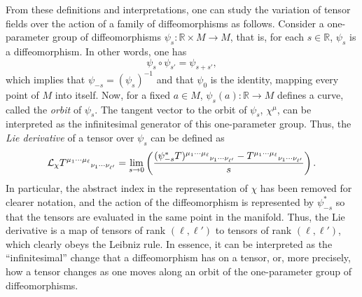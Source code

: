 \documentclass[
12pt,		%
openright,	%
twoside,  %
a4paper,			%
chapter=TITLE,		%
english,			%
french,				%
spanish,			%
brazil				%
]{USPSC-classe/USPSC}
\begin{document}
\begin{apendicesenv}
From these definitions and interpretations, one can study the variation of tensor fields over the action of a family of diffeomorphisms as follows. Consider a one-parameter group of diffeomorphisms $\psi_s:\mathbb{R}\times M\to M$, that is, for each $s\in\mathbb{R}$, $\psi_s$ is a diffeomorphism. In other words, one has 
\begin{equation}
    \psi_{s}\circ\psi_{s'}=\psi_{s+s'},
\end{equation}
which implies that $\psi_{-s}=(\psi_{s})^{-1}$ and that $\psi_0$ is the identity, mapping every point of $M$ into itself. Now, for a fixed $a\in M$, $\psi_s(a):\mathbb{R}\to M$ defines a curve, called the \textit{orbit} of $\psi_s$. The tangent vector to the orbit of $\psi_s$, $\chi^{\mu}$, can be interpreted as the infinitesimal generator of this one-parameter group. Thus, the \textit{Lie derivative} of a tensor over $\psi_s$ can be defined as
\begin{equation}\label{lie}
   \mathcal{L}_{\chi}T^{\mu_1\cdots\mu_{\ell}}\mathstrut_{\nu_1\cdots\nu_{\ell'}}=\lim_{s\to0}\left(\frac{(\psi_{-s}^*T)^{\mu_1\cdots\mu_{\ell}}\mathstrut_{\nu_1\cdots\nu_{\ell'}}-T^{\mu_1\cdots\mu_{\ell}}\mathstrut_{\nu_1\cdots\nu_{\ell'}}}{s}\right).
\end{equation}
In particular, the abstract index in the representation of $\chi$ has been removed for clearer notation, and the action of the diffeomorphism is represented by $\psi_{-s}^*$ so that the tensors are evaluated in the same point in the manifold. Thus, the Lie derivative is a map of tensors of rank $(\ell,\ell')$ to tensors of rank $(\ell,\ell')$, which clearly obeys the Leibniz rule. In essence, it can be interpreted as the ``infinitesimal'' change that a diffeomorphism has on a tensor, or, more precisely, how a tensor changes as one moves along an orbit of the one-parameter group of diffeomorphisms. 


\end{apendicesenv}
\end{document}
